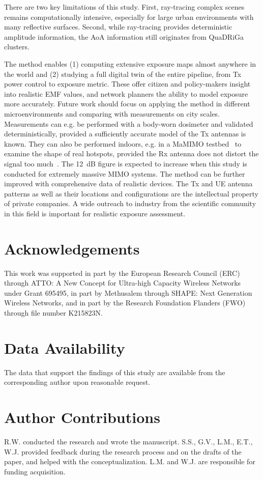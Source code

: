 \documentclass{IEEEtran}
\begin{document}
There are two key limitations of this study. First, ray-tracing complex scenes remains computationally intensive, especially for large urban environments with many reflective surfaces. Second, while ray-tracing provides deterministic amplitude information, the \gls{AoA} information still originates from QuaDRiGa clusters.

The method enables (1) computing extensive exposure maps almost anywhere in the world and (2) studying a full digital twin of the entire pipeline, from Tx power control to exposure metric. These offer citizen and policy-makers insight into realistic \gls{EMF} values, and network planners the ability to model exposure more accurately. Future work should focus on applying the method in different microenvironments and comparing with measurements on city scales. Measurements can e.g. be performed with a body-worn dosimeter and validated deterministically, provided a sufficiently accurate model of the Tx antennas is known. They can also be performed indoors, e.g. in a \gls{MaMIMO} testbed~\cite{4} to examine the shape of real hotspots, provided the Rx antenna does not distort the signal too much~\cite{QD/FDTD}. The 12~dB figure is expected to increase when this study is conducted for extremely massive MIMO systems. The method can be further improved with comprehensive data of realistic devices. The Tx and \gls{UE} antenna patterns as well as their locations and configurations are the intellectual property of private companies. A wide outreach to industry from the scientific community in this field is important for realistic exposure assessment.

\section{Acknowledgements}
This work was supported in part by the European Research Council (ERC) through ATTO: A New Concept for Ultra-high Capacity Wireless Networks under Grant 695495, in part by Methusalem through SHAPE: Next Generation Wireless Networks, and in part by the Research Foundation Flanders (FWO) through file number K215823N.

\section*{Data Availability}
The data that support the findings of this study are available from the corresponding author upon reasonable request.

\section*{Author Contributions}
R.W. conducted the research and wrote the manuscript. S.S., G.V., L.M., E.T., W.J. provided feedback during the research process and on the drafts of the paper, and helped with the conceptualization. L.M. and W.J. are responsible for funding acquisition.
\end{document}
